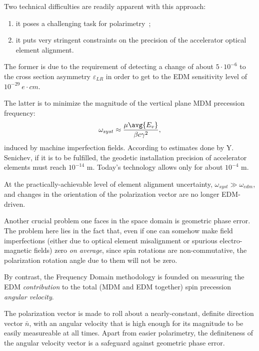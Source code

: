 \documentclass[a4paper]{jacow}
\newcommand{\w}{\omega}
\newcommand{\nbar}{\bar n}
\begin{document}
Two technical difficulties are readily apparent with this approach:
\begin{enumerate}
\item it poses a challenging task for polarimetry~\cite{Mane:SpinWheel};
\item it puts very stringent constraints on the precision of the accelerator optical element alignment.
\end{enumerate}

The former is due to the requirement of detecting a change of about $5\cdot 10^{-6}$ to the
cross section asymmetry $\varepsilon_{LR}$ in order to get to the EDM sensitivity level
of $10^{-29}~e\cdot cm$.~\cite[p.~18]{BNL:Deuteron2008}

The latter is to minimize the magnitude of the vertical plane
MDM precession frequency:~\cite[p.~11]{BNL:Deuteron2008}
\begin{equation}\label{eq:BNL_syst_err}
\w_{syst} \approx \frac{\mu\avg{E_v}}{\beta c\gamma^2},
\end{equation}
induced by machine imperfection fields. According to estimates done by Y. Senichev, if it is to be fulfilled, the geodetic installation precision of accelerator elements must reach $10^{-14}$ m. Today's technology allows only for about $10^{-4}$ m.

At the practically-achievable level of element alignment uncertainty, $\w_{syst} \gg \w_{edm}$,
and changes in the orientation of the polarization vector are no longer EDM-driven.

Another crucial problem one faces in the space domain is geometric phase error.~\cite[p.~6]{BNL:Proton}
The problem here lies in the fact that, even if one can somehow make field imperfections (either due to
optical element misalignment or spurious electro-magnetic fields) zero
\emph{on average}, since spin rotations are non-commutative, the polarization rotation angle due to them
will not be zero.

By contrast, the Frequency Domain methodology is founded on measuring the EDM \emph{contribution} to the total
(MDM and EDM together) spin precession \emph{angular velocity}.

The polarization vector is made to roll about a nearly-constant, definite direction vector $\nbar$,
with an angular velocity that is high enough for its magnitude to be easily measureable at all times.
Apart from easier polarimetry, the definiteness of the angular velocity vector is a safeguard against geometric
phase error.
\end{document}
